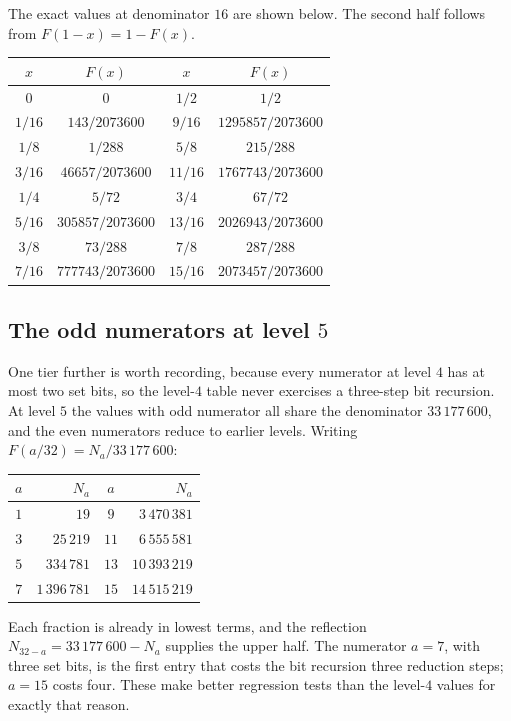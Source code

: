 \documentclass[11pt,oneside]{article}
\theoremstyle{definition}
\theoremstyle{remark}
\begin{document}
The exact values at denominator $16$ are shown below.  The second half follows from
$F(1-x)=1-F(x)$.

\begin{center}
\begin{tabular}{c@{\qquad}c|c@{\qquad}c}
\toprule
$x$&$F(x)$&$x$&$F(x)$\\
\midrule
$0$&$0$&$1/2$&$1/2$\\
$1/16$&$143/2073600$&$9/16$&$1295857/2073600$\\
$1/8$&$1/288$&$5/8$&$215/288$\\
$3/16$&$46657/2073600$&$11/16$&$1767743/2073600$\\
$1/4$&$5/72$&$3/4$&$67/72$\\
$5/16$&$305857/2073600$&$13/16$&$2026943/2073600$\\
$3/8$&$73/288$&$7/8$&$287/288$\\
$7/16$&$777743/2073600$&$15/16$&$2073457/2073600$\\
\bottomrule
\end{tabular}
\end{center}

\subsection{The odd numerators at level $5$}

One tier further is worth recording, because every numerator at level $4$ has at most two set
bits, so the level-$4$ table never exercises a three-step bit recursion.  At level $5$ the
values with odd numerator all share the denominator $33\,177\,600$, and the even numerators
reduce to earlier levels.  Writing $F(a/32)=N_a/33\,177\,600$:

\begin{center}
\begin{tabular}{c@{\qquad}r@{\qquad\qquad}c@{\qquad}r}
\toprule
$a$&$N_a$&$a$&$N_a$\\
\midrule
$1$&$19$&$9$&$3\,470\,381$\\
$3$&$25\,219$&$11$&$6\,555\,581$\\
$5$&$334\,781$&$13$&$10\,393\,219$\\
$7$&$1\,396\,781$&$15$&$14\,515\,219$\\
\bottomrule
\end{tabular}
\end{center}

Each fraction is already in lowest terms, and the reflection
$N_{32-a}=33\,177\,600-N_a$ supplies the upper half.  The numerator $a=7$, with three set
bits, is the first entry that costs the bit recursion three reduction steps; $a=15$ costs
four.  These make better regression tests than the level-$4$ values for exactly that reason.
\end{document}
